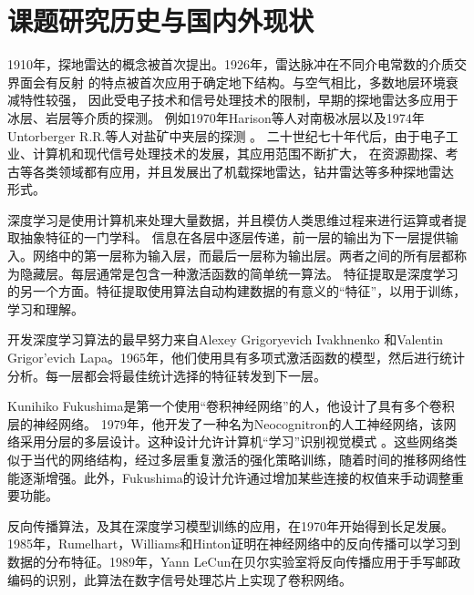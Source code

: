 \section{课题研究历史与国内外现状}
1910年，探地雷达的概念被首次提出。1926年，雷达脉冲在不同介电常数的介质交界面会有反射
的特点被首次应用于确定地下结构。与空气相比，多数地层环境衰减特性较强，
因此受电子技术和信号处理技术的限制，早期的探地雷达多应用于冰层、岩层等介质的探测。
例如1970年Harison等人对南极冰层以及1974年Untorberger R.R.等人对盐矿中夹层的探测
。
二十世纪七十年代后，由于电子工业、计算机和现代信号处理技术的发展，其应用范围不断扩大，
在资源勘探、考古等各类领域都有应用，并且发展出了机载探地雷达，钻井雷达等多种探地雷达
形式。

深度学习是使用计算机来处理大量数据，并且模仿人类思维过程来进行运算或者提取抽象特征的一门学科。
信息在各层中逐层传递，前一层的输出为下一层提供输入。网络中的第一层称为输入层，而最后一层称为输出层。两者之间的所有层都称为隐藏层。每层通常是包含一种激活函数的简单统一算法。
特征提取是深度学习的另一个方面。特征提取使用算法自动构建数据的有意义的“特征”，以用于训练，学习和理解。


开发深度学习算法的最早努力来自Alexey Grigoryevich Ivakhnenko 和Valentin Grigor'evich Lapa。1965年，他们使用具有多项式激活函数的模型，然后进行统计分析。每一层都会将最佳统计选择的特征转发到下一层。

Kunihiko Fukushima是第一个使用“卷积神经网络”的人，他设计了具有多个卷积层的神经网络。 1979年，他开发了一种名为Neocognitron的人工神经网络，该网络采用分层的多层设计。这种设计允许计算机“学习”识别视觉模式
。这些网络类似于当代的网络结构，经过多层重复激活的强化策略训练，随着时间的推移网络性能逐渐增强。此外，Fukushima的设计允许通过增加某些连接的权值来手动调整重要功能。

反向传播算法，及其在深度学习模型训练的应用，在1970年开始得到长足发展。1985年，Rumelhart，Williams和Hinton证明在神经网络中的反向传播可以学习到数据的分布特征。1989年，Yann LeCun在贝尔实验室将反向传播应用于手写邮政编码的识别，此算法在数字信号处理芯片上实现了卷积网络。

